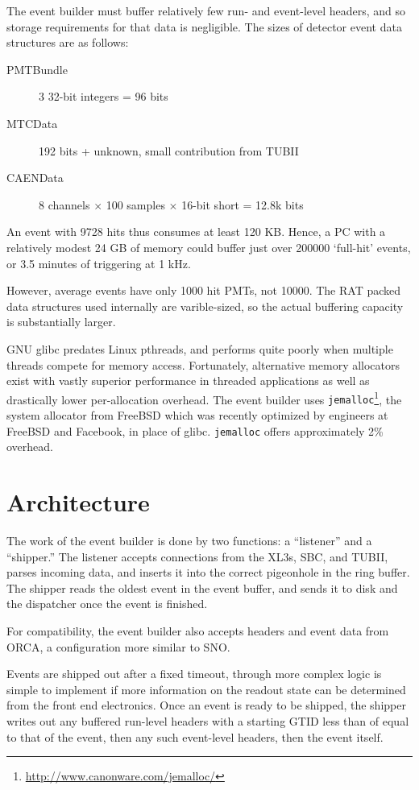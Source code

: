\documentclass[11pt,twocolumn]{article}
\begin{document}
The event builder must buffer relatively few run- and event-level headers, and so storage requirements for that data is negligible. The sizes of detector event data structures are as follows:
\begin{description}
\item[PMTBundle] 3 32-bit integers = 96 bits
\item[MTCData] 192 bits + unknown, small contribution from TUBII
\item[CAENData] 8 channels $\times$ 100 samples $\times$ 16-bit short = 12.8k bits
\end{description}
An event with 9728 hits thus consumes at least 120 KB. Hence, a PC with a relatively modest 24 GB of memory could buffer just over 200000 `full-hit' events, or 3.5 minutes of triggering at 1 kHz.

However, average events have only 1000 hit PMTs, not 10000. The RAT packed data structures used internally are varible-sized, so the actual buffering capacity is substantially larger.

GNU glibc predates Linux pthreads, and performs quite poorly when multiple threads compete for memory access. Fortunately, alternative memory allocators exist with vastly superior performance in threaded applications as well as drastically lower per-allocation overhead. The event builder uses {\tt jemalloc}\footnote{\href{http://www.canonware.com/jemalloc/}{http://www.canonware.com/jemalloc/}}, the system allocator from FreeBSD which was recently optimized by engineers at FreeBSD and Facebook, in place of glibc. {\tt jemalloc} offers approximately 2\% overhead.

\section{Architecture}
The work of the event builder is done by two functions: a ``listener'' and a ``shipper.'' The listener accepts connections from the XL3s, SBC, and TUBII, parses incoming data, and inserts it into the correct pigeonhole in the ring buffer. The shipper reads the oldest event in the event buffer, and sends it to disk and the dispatcher once the event is finished.

For compatibility, the event builder also accepts headers and event data from ORCA, a configuration more similar to SNO.

Events are shipped out after a fixed timeout, through more complex logic is simple to implement if more information on the readout state can be determined from the front end electronics. Once an event is ready to be shipped, the shipper writes out any buffered run-level headers with a starting GTID less than of equal to that of the event, then any such event-level headers, then the event itself.
\end{document}

